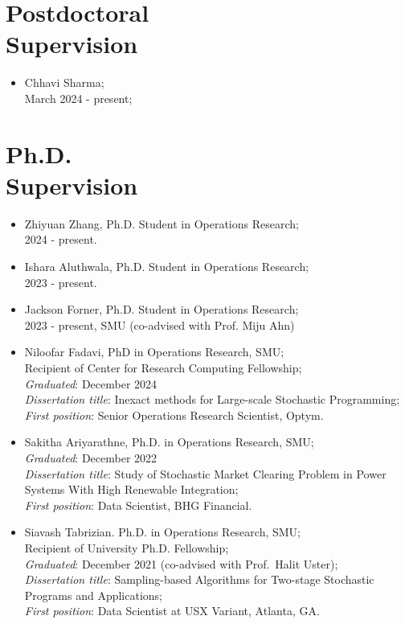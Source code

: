 \documentclass[hyperref, margin]{myResume}
\begin{document}
\begin{resume}
\section{Postdoctoral \\Supervision}
	\begin{itemize}[leftmargin=*]
		\item Chhavi Sharma;\\
		March 2024 - present;
	\end{itemize}

\section{Ph.D. \\Supervision}
	\begin{itemize}[leftmargin=*]
		\item Zhiyuan Zhang, Ph.D. Student in Operations Research;\\
		2024 - present. 
		
		\item Ishara Aluthwala, Ph.D. Student in Operations Research;\\
		2023 - present. 

		\item Jackson Forner, Ph.D. Student in Operations Research;\\
		2023 - present, SMU (co-advised with Prof. Miju Ahn)

		\item Niloofar Fadavi, PhD in Operations Research, SMU; \\
		Recipient of Center for Research Computing Fellowship; \\
		\emph{Graduated}: December 2024\\
		\emph{Dissertation title}: Inexact methods for Large-scale Stochastic Programming;\\
		\emph{First position}: Senior Operations Research Scientist, Optym.

		\item Sakitha Ariyarathne, Ph.D. in Operations Research, SMU;\\
		\emph{Graduated}: December 2022\\
		\emph{Dissertation title}: Study of Stochastic Market Clearing Problem in Power Systems With High Renewable Integration;\\
		\emph{First position}: Data Scientist, BHG Financial.

		\item Siavash Tabrizian. Ph.D. in Operations Research, SMU;\\
		Recipient of University Ph.D. Fellowship;\\
		\emph{Graduated}: December 2021 (co-advised with Prof.\ Halit Uster);\\
		\emph{Dissertation title}: Sampling-based Algorithms for Two-stage Stochastic Programs and Applications;\\
		\emph{First position}: Data Scientist at USX Variant, Atlanta, GA.
	\end{itemize}


\end{resume}
\end{document}
